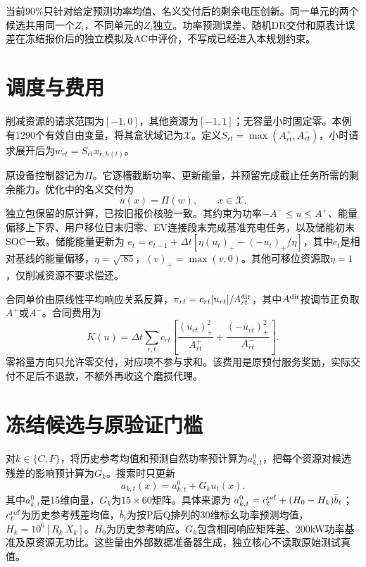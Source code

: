 \documentclass[UTF8,11pt,a4paper,fontset=fandol]{ctexart}
\begin{document}
当前90\%只针对给定预测功率均值、名义交付后的剩余电压创新。同一单元的两个候选共用同一个$Z_i$，不同单元的$Z_i$独立。功率预测误差、随机DR交付和原表计误差在冻结报价后的独立模拟及AC中评价，不写成已经进入本规划约束。

\section{调度与费用}
削减资源的请求范围为$[-1,0]$，其他资源为$[-1,1]$；无容量小时固定零。本例有1290个有效自由变量，将其盒状域记为$\mathcal X$。定义$S_{rt}=\max(A^+_{rt},A^-_{rt})$，小时请求展开后为$w_{rt}=S_{rt}x_{r,h(t)}$。

原设备控制器记为$\Pi$。它逐槽截断功率、更新能量，并预留完成截止任务所需的剩余能力。优化中的名义交付为
\begin{equation}
\boxed{u(x)=\Pi(w),\qquad x\in\mathcal X.}
\label{dispatch}
\end{equation}
独立包保留的原计算，已按旧报价核验一致。其约束为功率$-A^-\le u\le A^+$、能量偏移上下界、用户移位日末归零、EV连接段末完成基准充电任务，以及储能初末SOC一致。储能能量更新为
$e_t=e_{t-1}+\Delta t[\eta(u_t)_+-(-u_t)_+/\eta]$，其中$e_t$是相对基线的能量偏移，$\eta=\sqrt{.85}$，$(v)_+=\max(v,0)$。其他可移位资源取$\eta=1$，仅削减资源不要求偿还。

合同单价由原线性平均响应关系反算，$\pi_{rt}=c_{rt}|u_{rt}|/A^{\rm dir}_{rt}$，其中$A^{\rm dir}$按调节正负取$A^+$或$A^-$。合同费用为
\begin{equation}
\boxed{K(u)=\Delta t\sum_{r,t}c_{rt}\left[
\frac{(u_{rt})_+^2}{A^+_{rt}}+
\frac{(-u_{rt})_+^2}{A^-_{rt}}\right].}
\label{cost}
\end{equation}
零裕量方向只允许零交付，对应项不参与求和。该费用是原预付服务奖励，实际交付不足后不退款，不额外再收这个磨损代理。

\section{冻结候选与原验证门槛}
对$k\in\{C,F\}$，将历史参考均值和预测自然功率预计算为$a^0_{k,t}$，把每个资源对候选残差的影响预计算为$G_k$。搜索时只更新
\begin{equation}
\boxed{a_{k,t}(x)=a^0_{k,t}+G_ku_t(x).}
\label{mean}
\end{equation}
其中$a^0_{k,t}$是15维向量，$G_k$为$15\times60$矩阵。具体来源为
$a^0_{k,t}=c_t^{\rm ref}+(H_0-H_k)\bar b_t$；$c_t^{\rm ref}$为历史参考残差均值，$\bar b_t$为按P后Q排列的30维标幺功率预测均值，$H_k=10^6[R_k\ X_k]$。$H_0$为历史参考响应。$G_k$包含相同响应矩阵差、200kW功率基准及原资源无功比。这些量由外部数据准备器生成，独立核心不读取原始测试真值。
\end{document}
